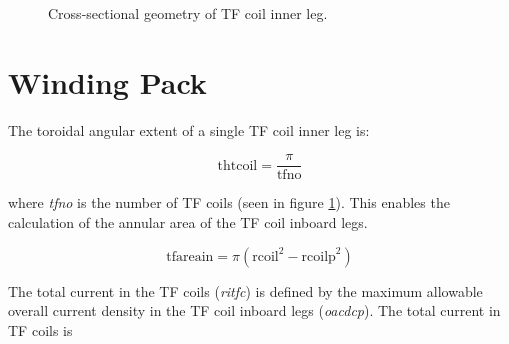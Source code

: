 \documentclass[hidelinks]{article}
\numberwithin{equation}{section}
\begin{document}
    \begin{figure}[!b]
     \begin{center}
    \end{center}
    \caption{Cross-sectional geometry of TF coil inner leg.} \label{fig: geom-1}
    \end{figure}

    \section{Winding Pack}

    \noi The toroidal angular extent of a single TF coil inner leg is:

    \begin{equation}\label{eq: thtcoil}
    \text{thtcoil} = \frac{\pi}{\text{tfno}} 
    \end{equation}

    \noi where \emph{tfno} is the number of TF coils (seen in figure \ref{fig: geom-1}). 
    This enables the calculation of the annular area of the TF coil inboard legs.

    \begin{equation}\label{eq: tfareain}
    \text{tfareain} = \pi (\text{rcoil}^2 - \text{rcoilp}^2) 
    \end{equation}

    \noi The total current in the TF coils (\emph{ritfc}) is defined by the maximum allowable 
    overall current density in the TF coil inboard legs (\emph{oacdcp}). The total current 
    in TF coils is 
    
\end{document}
